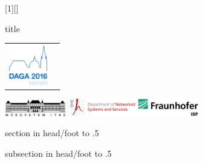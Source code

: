 [1][]
{
	\centering
	\vfill
	\begin{beamercolorbox}[wd=\textwidth,sep=1ex,center]{title}
	{
		\vfill
		\inserttitle\par
	}
	\end{beamercolorbox}
	\bigskip
	{\insertauthor\par}
	\smallskip
	{\insertemail\par}
	\bigskip
	\begin{tabular}{cc}
	\includegraphics[height=1.75cm]{logos/daga2016logo.png} &
	{\usebeamerfont{date}\small\parbox[b][1.75cm][c]{5cm}{\centering \insertdate}}
	\end{tabular}
	\par
	\bigskip
	{
		{\includegraphics[height=0.75cm]{logos/bme1782_logo.pdf}}
		\hspace{0.5cm}
		{\includegraphics[height=0.75cm]{logos/hitlogo_2013_en.png}}
		\hspace{0.5cm}
		{\includegraphics[height=0.75cm]{logos/ibp_logo.png}}
		\par
	}

}

\makeatletter
{}
{%
  \leavevmode%
  \begin{beamercolorbox}[wd=.5\paperwidth,ht=2.5ex,dp=1.125ex]{section in head/foot}%
	\hbox to .5\paperwidth{\insertsectionnavigationhorizontal{.5\paperwidth}{}{\hfill\hfill}}

  \end{beamercolorbox}%
  \begin{beamercolorbox}[wd=.5\paperwidth,ht=2.5ex,dp=1.125ex]{subsection in head/foot}%
    \hbox to .5\paperwidth{\hspace*{3ex}\insertsubsectionhead\hfil}
  \end{beamercolorbox}%
}
\makeatother

